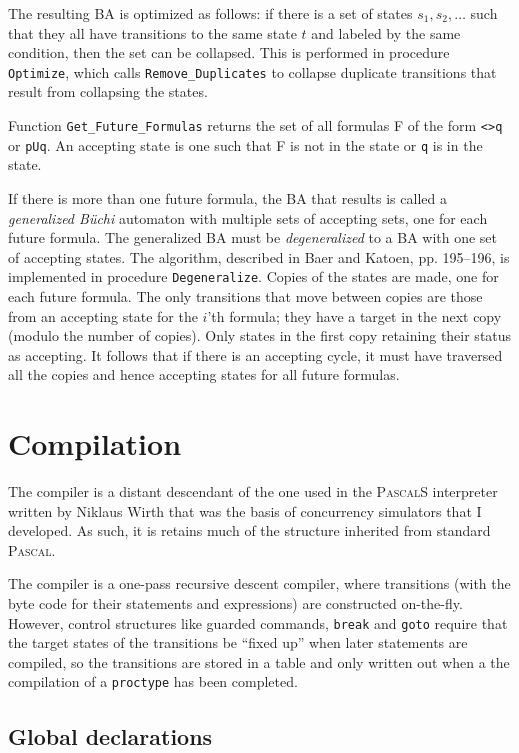 \documentclass[11pt]{article}
\newcommand*{\p}[1]{\texttt{#1}}
\begin{document}
The resulting BA is optimized as follows: if there is a set of states
$s_{1}, s_{2}, \ldots$ such that they all have transitions to the same
state $t$ and labeled by the same condition, then the set can be collapsed.
This is performed in procedure \p{Optimize}, which calls
\p{Remove\_Duplicates} to collapse duplicate transitions that result
from collapsing the states.

Function \p{Get\_Future\_Formulas} returns the set of all formulas F of
the form \p{<>q} or \p{pUq}. An accepting state is one such that F is
not in the state or \p{q} is in the state.

If there is more than one future formula, the BA that results is called
a \emph{generalized B\"{u}chi} automaton with multiple sets of accepting
sets, one for each future formula. The generalized BA must be
\emph{degeneralized} to a BA with one set of accepting states. The
algorithm, described in Baer and Katoen, pp. 195--196, is implemented in
procedure \p{Degeneralize}. Copies of the states are made, one for each
future formula. The only transitions that move between copies are those
from an accepting state for the $i$'th formula; they have a target in
the next copy (modulo the number of copies). Only states in the first
copy retaining their status as accepting. It follows that if there is an
accepting cycle, it must have traversed all the copies and hence
accepting states for all future formulas.

\newpage

\section{Compilation}

The compiler is a distant descendant of the one used in the
\textsc{PascalS} interpreter written by Niklaus Wirth that was the basis
of concurrency simulators that I developed. As such, it is retains much
of the structure inherited from standard \textsc{Pascal}.

The compiler is a one-pass recursive descent compiler, where transitions
(with the byte code for their statements and expressions) are
constructed on-the-fly. However, control structures like guarded
commands, \p{break} and \p{goto} require that the target states of the
transitions be ``fixed up'' when later statements are compiled, so the
transitions are stored in a table and only written out when a the compilation
of a \p{proctype} has been completed.

\subsection{Global declarations}
\end{document}
